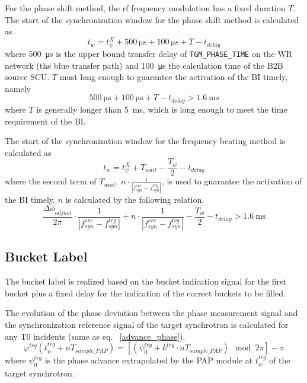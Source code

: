 For the phase shift method, the rf frequency modulation has a fixed duration $T$. The start of the synchronization window for the phase shift method is calculated as
\begin{equation}
t_\mathit{w}=t_\psi^\mathit{X}+\SI{500}{\us}+\SI{100}{\us}+T-t_\mathit{delay}\label{syn_win_start}
\end{equation}
where \SI{500}{\us} is the upper bound transfer delay of \verb|TGM_PHASE_TIME| on the WR network (the blue transfer path) and \SI{100}{\us} the calculation time of the B2B source SCU. $T$ must long enough to guarantee the activation of the BI timely, namely
\begin{equation}
\SI{500}{\us}+\SI{100}{\us}+T-t_\mathit{delay}> \SI{1.6}{\ms}
\end{equation}
where $T$ is generally longer than \SI{5}{\ms}, which is long enough to meet the time requirement of the BI. 

The start of the synchronization window for the frequency beating method is calculated as
\begin{equation}
t_\mathit{w}= t_\psi^\mathit{X}+T_\mathit{wait}-\frac{T_w}{2}-t_\mathit{delay}\label{syn_win_start1}
\end{equation}
where the second term of $T_\mathit{wait}$, $n\cdot \frac{1}{|f_{\mathit{syn}}^\mathit{src}-f_{\mathit{syn}}^\mathit{trg}|}$, is used to guarantee the activation of the BI timely. $n$ is calculated by the following relation.
\begin{equation}
\frac{\Delta \phi_\mathit{adjust}}{2\pi}\cdot\frac{1}{|f_{\mathit{syn}}^\mathit{src}-f_{\mathit{syn}}^\mathit{trg}|}+n\cdot \frac{1}{|f_{\mathit{syn}}^\mathit{src}-f_{\mathit{syn}}^\mathit{trg}|}-\frac{T_w}{2}-t_\mathit{delay}> \SI{1.6}{\ms}
\end{equation}


\subsection{Bucket Label}
\label{sec:bucket_label}
The bucket label is realized based on the bucket indication signal for the first bucket plus a fixed delay for the indication of the correct buckets to be filled. 

The evolution of the phase deviation between the phase measurement signal and the synchronization reference signal of the target synchrotron is calculated for any T0 incidents (same as eq. ~\ref{advance_phase}).
\begin{equation}
\varphi^\mathit{trg}(t_\mathit{\psi}^\mathit{trg}+nT_\mathit{sample\_PAP})=[(\psi^\mathit{trg}_0+k^\mathit{trg}\cdot nT_\mathit{sample\_PAP}) \mod 2\pi] - \pi
\end{equation}
where $\psi^\mathit{trg}_0$ is the phase advance extrapolated by the PAP module at $t_\mathit{\psi}^\mathit{trg}$ of the target synchrotron.

